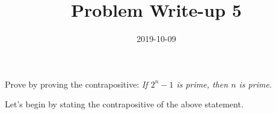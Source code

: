 \documentclass[a4paper,12pt]{article}
\title{Problem Write-up 5}
\date{2019-10-09}
\begin{document}
	\begin{problem}
		Prove by proving the contrapositive: \textit{If \(2^n - 1\) is prime, then \(n\) is prime}.
	\end{problem}
	\begin{answer}
		Let's begin by stating the contrapositive of the above statement.
		\
	\end{answer}
\end{document}
